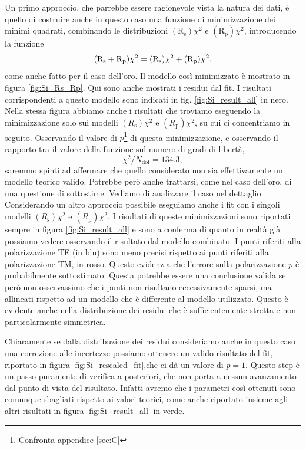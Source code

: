 \documentclass[
    prb,altaffilletter,citeautoscript,
    amsmath,amssymb,
    showpacs,showkeys,floatfix,
    reprint
]{revtex4-1}
\begin{document}
Un primo approccio, che parrebbe essere ragionevole vista la natura dei dati, è quello di costruire anche in questo caso una funzione di minimizzazione dei minimi quadrati, combinando le distribuzioni $(\mathrm{R_s})\chi^2$ e $(\mathrm{R_p})\chi^2$, introducendo la funzione \begin{equation}
    \qty(\mathrm{R_s}+ \mathrm{R_p})\chi^2 = (\mathrm{R_s})\chi^2 + (\mathrm{R_p})\chi^2,
\end{equation} come anche fatto per il caso dell'oro. Il modello così minimizzato è mostrato in figura \ref{fig:Si_Rs_Rp}. Qui sono anche mostrati i residui dal fit. I risultati corrispondenti a questo modello sono indicati in fig. \ref{fig:Si_result_all} in nero. Nella stessa figura abbiamo anche i risultati che troviamo eseguendo la minimizzazione solo sui modelli $(R_\mathrm{s})\chi^2$ e $(R_\mathrm{p})\chi^2$, su cui ci concentriamo in seguito. Osservando il valore di $p$\footnote{Confronta appendice \ref{sec:C}} di questa minimizzazione, e osservando il rapporto tra il valore della funzione sul numero di gradi di libertà, \[\chi^2/N_\mathrm{dof} = 134.3,\] saremmo spinti ad affermare che quello considerato non sia effettivamente un modello teorico valido. Potrebbe però anche trattarsi, come nel caso dell'oro, di una questione di sottostime. Vediamo di analizzare il caso nel dettaglio. Considerando un altro approccio possibile eseguiamo anche i fit con i singoli modelli $(R_\mathrm{s})\chi^2$ e $(R_\mathrm{p})\chi^2$. I risultati di queste minimizzazioni sono riportati sempre in figura \ref{fig:Si_result_all} e sono a conferma di quanto in realtà già possiamo vedere osservando il risultato dal modello combinato. I punti riferiti alla polarizzazione TE (in blu) sono meno precisi rispetto ai punti riferiti alla polarizzazione TM, in rosso. Questo evidenzia che l'errore sulla polarizzazione $p$ è probabilmente sottostimato. Questa potrebbe essere una conclusione valida se però non osservassimo che i punti non risultano eccessivamente sparsi, ma allineati rispetto ad un modello che è differente al modello utilizzato. Questo è evidente anche nella distribuzione dei residui che è sufficientemente stretta e non particolarmente simmetrica. 

Chiaramente se dalla distribuzione dei residui consideriamo anche in questo caso una correzione alle incertezze possiamo ottenere un valido risultato del fit, riportato in figura \ref{fig:Si_rescaled_fit},che ci dà un valore di $p=1$. Questo step è un passo puramente di verifica a posteriori, che non porta a nessun avanzamento dal punto di vista del risultato. Infatti avremo che i parametri così ottenuti sono comunque sbagliati rispetto ai valori teorici, come anche riportato insieme agli altri risultati in figura \ref{fig:Si_result_all} in verde. 
\end{document}
